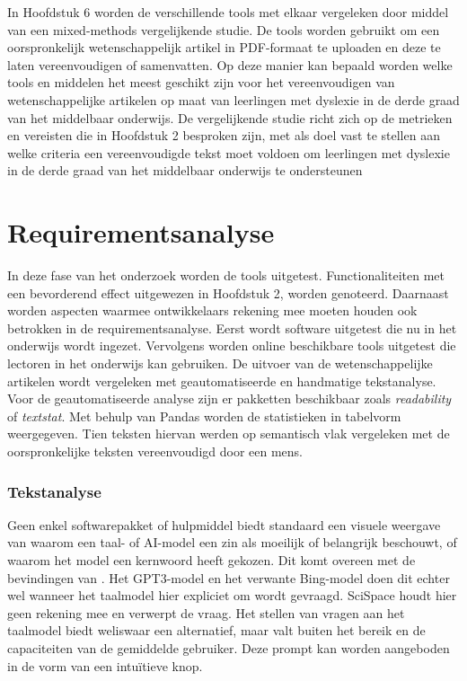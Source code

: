 In Hoofdstuk 6 worden de verschillende tools met elkaar vergeleken door middel van een mixed-methods vergelijkende studie. De tools worden gebruikt om een oorspronkelijk wetenschappelijk artikel in PDF-formaat te uploaden en deze te laten vereenvoudigen of samenvatten. Op deze manier kan bepaald worden welke tools en middelen het meest geschikt zijn voor het vereenvoudigen van wetenschappelijke artikelen op maat van leerlingen met dyslexie in de derde graad van het middelbaar onderwijs. De vergelijkende studie richt zich op de metrieken en vereisten die in Hoofdstuk 2 besproken zijn, met als doel vast te stellen aan welke criteria een vereenvoudigde tekst moet voldoen om leerlingen met dyslexie in de derde graad van het middelbaar onderwijs te ondersteunen

\chapter{Requirementsanalyse}

In deze fase van het onderzoek worden de tools uitgetest. Functionaliteiten met een bevorderend effect uitgewezen in Hoofdstuk 2, worden genoteerd. Daarnaast worden aspecten waarmee ontwikkelaars rekening mee moeten houden ook betrokken in de requirementsanalyse. Eerst wordt software uitgetest die nu in het onderwijs wordt ingezet. Vervolgens worden online beschikbare tools uitgetest die lectoren in het onderwijs kan gebruiken. De uitvoer van de wetenschappelijke artikelen wordt vergeleken met geautomatiseerde en handmatige tekstanalyse. Voor de geautomatiseerde analyse zijn er pakketten beschikbaar zoals \textit{readability} of \textit{textstat}. Met behulp van Pandas worden de statistieken in tabelvorm weergegeven. Tien teksten hiervan werden op semantisch vlak vergeleken met de oorspronkelijke teksten vereenvoudigd door een mens.

\subsection{Tekstanalyse}

Geen enkel softwarepakket of hulpmiddel biedt standaard een visuele weergave van waarom een taal- of AI-model een zin als moeilijk of belangrijk beschouwt, of waarom het model een kernwoord heeft gekozen. Dit komt overeen met de bevindingen van \textcite{Gooding2019}. Het GPT3-model en het verwante Bing-model doen dit echter wel wanneer het taalmodel hier expliciet om wordt gevraagd. SciSpace houdt hier geen rekening mee en verwerpt de vraag. Het stellen van vragen aan het taalmodel biedt weliswaar een alternatief, maar valt buiten het bereik en de capaciteiten van de gemiddelde gebruiker. Deze prompt kan worden aangeboden in de vorm van een intuïtieve knop. 


